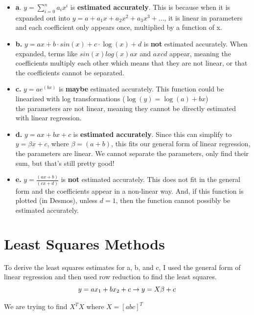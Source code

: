 \documentclass[12pt]{article}
\begin{document}
\begin{itemize}
    \item \textbf{a}. $\boxed{y=\sum_{i=0}^{n} a_i x^i}$ is \textbf{estimated accurately}. This is because when it is expanded out into $y = a + a_1 x + a_2 x^2 + a_3 x^3 + ...$, it is linear in parameters and each coefficient only appears once, multiplied by a function of x.
    \item \textbf{b.} $\boxed{y=ax + b \cdot sin(x) + c \cdot \log (x) + d}$ is \textbf{not} estimated accurately. When expanded, terms like $sin(x)log(x)ax$ and $axcd$ appear, meaning the coefficients multiply each other which means that they are not linear, or that the coefficients cannot be separated.
    \item \textbf{c.} $\boxed{y=ae^{(bx)}}$ is \textbf{maybe} estimated accurately. This function could be linearized with log transformations ($\log (y) = \log (a) + bx$) \\
              the parameters are not linear, meaning they cannot be directly estimated with linear regression.
    \item \textbf{d.} $\boxed{y=ax + bx + c}$ is \textbf{estimated accurately}. Since this can simplify to $y = \beta x + c$, where $\beta = (a+b)$, this fits our general form of linear regression, the parameters are linear. We cannot separate the parameters, only find their sum, but that's still pretty good!
    \item \textbf{e.} $\boxed{y = \frac{(ax + b)}{(cx + d)}}$ is \textbf{not} estimated accurately. This does not fit in the general form and the coefficients appear in a non-linear way. And, if this function is plotted (in Desmos), unless $d = 1$, then the function cannot possibly be estimated accurately.
\end{itemize}

\section{Least Squares Methods}

To derive the least squares estimates for a, b, and c, I used the general form of linear regression and then used row reduction to find the least squares.
\begin{equation}
y = ax_1 + bx_2 + c \rightarrow y = X\beta + c \\
\end{equation}

We are trying to find $X^T X$ where $X = [a b c]^T$
\end{document}

